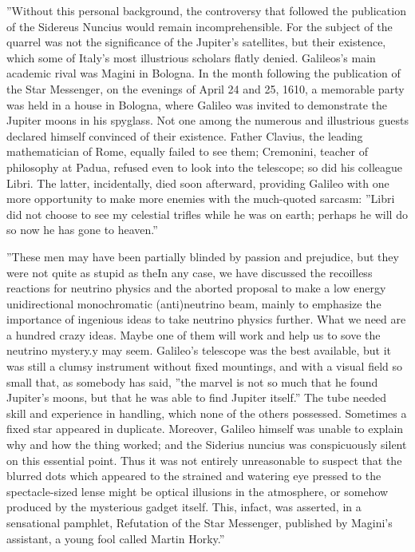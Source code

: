 ”Without this personal background, the controversy that followed the publication of the
Sidereus Nuncius would remain incomprehensible. For the subject of the quarrel was not
the significance of the Jupiter’s satellites, but their existence, which some of Italy’s most
illustrious scholars flatly denied. Galileos’s main academic rival was Magini in Bologna.
In the month following the publication of the Star Messenger, on the evenings of April
24 and 25, 1610, a memorable party was held in a house in Bologna, where Galileo was
invited to demonstrate the Jupiter moons in his spyglass. Not one among the numerous and
illustrious guests declared himself convinced of their existence. Father Clavius, the leading
mathematician of Rome, equally failed to see them; Cremonini, teacher of philosophy at
Padua, refused even to look into the telescope; so did his colleague Libri. The latter,
incidentally, died soon afterward, providing Galileo with one more opportunity to make
more enemies with the much-quoted sarcasm: ”Libri did not choose to see my celestial
trifles while he was on earth; perhaps he will do so now he has gone to heaven.”

”These men may have been partially blinded by passion and prejudice, but they were
not quite as stupid as theIn any case, we have discussed the recoilless reactions for neutrino physics and the aborted
proposal to make a low energy unidirectional monochromatic (anti)neutrino beam, mainly
to emphasize the importance of ingenious ideas to take neutrino physics further. What we
need are a hundred crazy ideas. Maybe one of them will work and help us to sove the
neutrino mystery.y may seem. Galileo’s telescope was the best available, but it was
still a clumsy instrument without fixed mountings, and with a visual field so small that, as
somebody has said, ”the marvel is not so much that he found Jupiter’s moons, but that he
was able to find Jupiter itself.” The tube needed skill and experience in handling, which none
of the others possessed. Sometimes a fixed star appeared in duplicate. Moreover, Galileo
himself was unable to explain why and how the thing worked; and the Siderius nuncius
was conspicuously silent on this essential point. Thus it was not entirely unreasonable to
suspect that the blurred dots which appeared to the strained and watering eye pressed to
the spectacle-sized lense might be optical illusions in the atmosphere, or somehow produced
by the mysterious gadget itself. This, infact, was asserted, in a sensational pamphlet, Refutation of the Star Messenger, published by Magini’s assistant, a young fool called Martin
Horky.”

